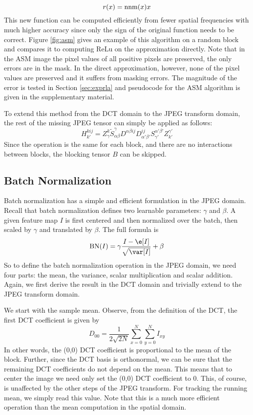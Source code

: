 \documentclass[10pt,twocolumn,letterpaper]{article}
\begin{document}
\begin{equation}
    r(x) = \mathrm{nnm}(x)x
\end{equation}
This new function can be computed efficiently from fewer spatial frequencies with much higher accuracy since only the sign of the original function needs to be correct. Figure \ref{fig:asm} gives an example of this algorithm on a random block and compares it to computing ReLu on the approximation directly. Note that in the ASM image the pixel values of all positive pixels are preserved, the only errors are in the mask. In the direct approximation, however, none of the pixel values are preserved and it suffers from masking errors. The magnitude of the error is tested in Section \ref{sec:exprla} and pseudocode for the ASM algorithm is given in the supplementary material. 

To extend this method from the DCT domain to the JPEG transform domain, the rest of the missing JPEG tensor can simply be applied as follows:
\begin{equation}
H^{k ij}_{k'} = Z^{k}_{\gamma} \widetilde{S}^{\gamma}_{\alpha\beta} D^{\alpha\beta ij}D^{ij}_{\alpha'\beta'} S^{\alpha'\beta'}_{\gamma'} Z^{\gamma'}_{k'}
\end{equation}
Since the operation is the same for each block, and there are no interactions between blocks, the blocking tensor $B$ can be skipped.

\subsection{Batch Normalization}\label{sec:jdrbn}

Batch normalization \cite{ioffe2015batch} has a simple and efficient formulation in the JPEG domain. Recall that batch normalization defines two learnable parameters: $\gamma$ and $\beta$. A given feature map $I$ is first centered and then normalized over the batch, then scaled by $\gamma$ and translated by $\beta$. The full formula is
\begin{equation}
\text{BN}(I) = \gamma\frac{I - \e[I]}{\sqrt{\var[I]}} + \beta
\end{equation}
So to define the batch normalization operation in the JPEG domain, we need four parts: the mean, the variance, scalar multiplication and scalar addition. Again, we first derive the result in the DCT domain and trivially extend to the JPEG transform domain.

We start with the sample mean. Observe, from the definition of the DCT, the first DCT coefficient is given by 
\begin{equation}
D_{00} = \frac{1}{2\sqrt{2N}}\sum_{x=0}^N\sum_{y=0}^N I_{xy}
\end{equation}
In other words, the (0,0) DCT coefficient is proportional to the mean of the block. Further, since the DCT basis is orthonormal, we can be sure that the remaining DCT coefficients do not depend on the mean. This means that to center the image we need only set the (0,0) DCT coefficient to 0. This, of course, is unaffected by the other steps of the JPEG transform. For tracking the running mean, we simply read this value. Note that this is a much more efficient operation than the mean computation in the spatial domain.
\end{document}
